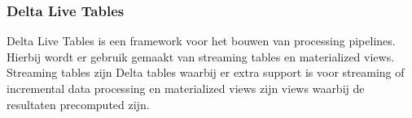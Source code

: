 \subsubsection{Delta Live Tables}

Delta Live Tables is een framework voor het bouwen van processing pipelines. Hierbij wordt er gebruik gemaakt van streaming tables en materialized views. Streaming tables zijn Delta tables waarbij er extra support is voor streaming of incremental data processing en materialized views zijn views waarbij de resultaten precomputed zijn.~\autocite{Microsoft2024b}



%
%
%
%    
%
%
%
%
%
